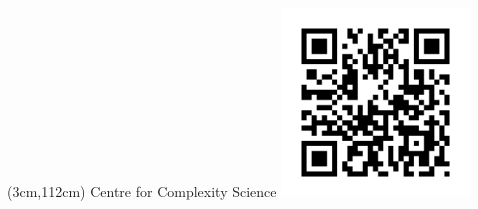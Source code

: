 \documentclass[xcolor={table}]{beamer}
\begin{document}
\begin{frame}[fragile=singleslide,t]


\begin{textblock*}{10cm}(3cm,112cm) %
Centre for Complexity Science
\includegraphics[height=5cm, width=5cm]{QR_code_for_mobile_English_Wikipedia.svg.png}
\end{textblock*}
\end{frame}
\end{document}

